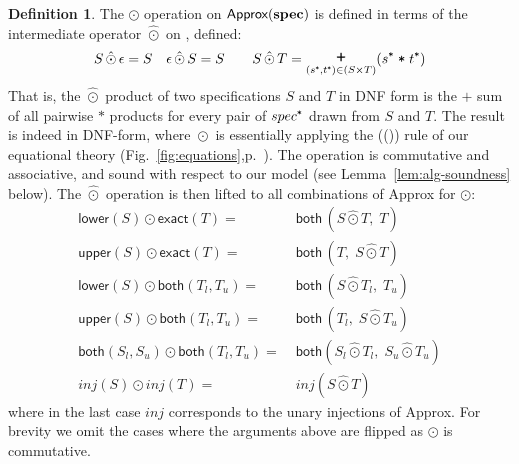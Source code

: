 \documentclass[10pt,preprint]{sigplanconf}
\newcounter{block}
\theoremstyle{definition}
\newtheorem{definition}[block]{Definition}
\newcommand{\term}[1]{\texttt{#1}}
\newcommand{\trule}[1]{{\footnotesize{(\text{#1})}}}
\begin{document}
\begin{definition} The $\odot$ operation on $\textsf{Approx}(\textbf{spec}{})$
  is defined in terms of the intermediate operator $\hat{\odot}$ on
  \specDNF{}, defined:
\begin{align*}
S \,\hat{\odot}\, \epsilon = S \quad
\epsilon \,\hat{\odot}\, S = S \qquad
S \,\hat{\odot}\, T = \bplus_{(\tyProd{s}, \tyProd{t}) \in (S \times
   T)} (\tyProd{s} \; \term{*} \; \tyProd{t})
\end{align*}
That is, the $\hat{\odot}$ product of two specifications $S$ and $T$ in DNF form
is the $\term{+}$ sum of all pairwise $\term{*}$ products for every
pair of $\tyProd{spec}$ drawn from $S$ and $T$. The result
is indeed in DNF-form, where $\hat{\odot}$ is essentially applying
 the (\trule{\textsc{dist}}) rule of our equational theory
 (Fig.~\ref{fig:equations},p.~\pageref{fig:equations}). The operation is
commutative and associative, and sound with respect to our
model (see Lemma~\ref{lem:alg-soundness} below).
The $\hat{\odot}$ operation is then lifted to all combinations of
\textsf{Approx} for $\odot$:
\begin{align*}
\textsf{lower}(S) \odot \textsf{exact}(T) = \; &
       \textsf{both} \, (S \hat{\odot} T, \; T) \\
\textsf{upper}(S) \odot \textsf{exact}(T) = \; &
       \textsf{both} \, (T, \; S \hat{\odot} T) \\
\textsf{lower}(S) \odot \textsf{both}(T_l,T_u) = \; &
        \textsf{both} \, (S \hat{\odot} T_l, \; T_u) \\
\textsf{upper}(S) \odot \textsf{both}(T_l,T_u) = \; & \textsf{both} \,
                                                      (T_l, \; S \hat{\odot} T_u) \\
\textsf{both}(S_l,S_u) \odot
\textsf{both}(T_l,T_u)  = \; & \textsf{both} (S_l \hat{\odot} T_l, \; S_u
                         \hat{\odot} T_u) \\
\textit{inj}(S) \odot \textit{inj}(T) = \; & \textit{inj}(S
                                              \hat{\odot} T)
\end{align*}
where in the last case $\textit{inj}$ corresponds to the unary
injections of \textsf{Approx}. For brevity we omit the cases where the arguments above are flipped
as $\odot$ is commutative.
\end{definition}
\end{document}
